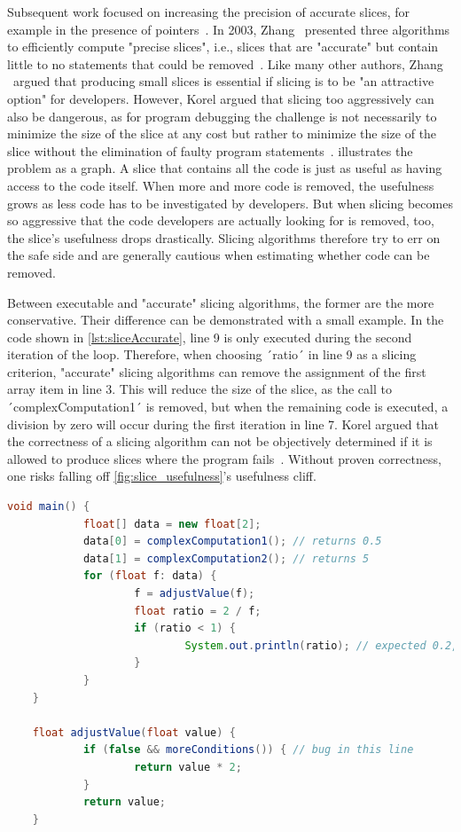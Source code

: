 Subsequent work focused on increasing the precision of accurate slices, for example in the presence of pointers~\cite{atkinson02:program_slicing_using_dynamic, agrawal91:dynamic_slicing_in}.
In 2003, Zhang \etal\ presented three algorithms to efficiently compute "precise slices", i.e., slices that are "accurate" but contain little to no statements that could be removed~\cite{zhang03:precise_dynamic_slicing_algorithms}.
Like many other authors, Zhang \etal\ argued that producing small slices is essential if slicing is to be "an attractive option" for developers.
However, Korel argued that slicing too aggressively can also be dangerous, as
for program debugging the challenge is not necessarily to minimize the size of the slice at any cost but rather to minimize the size of the slice without the elimination of faulty program statements~\cite{korel98:dynamic_program_slicing_methods}.
 illustrates the problem as a graph.
A slice that contains all the code is just as useful as having access to the code itself.
When more and more code is removed, the usefulness grows as less code has to be investigated by developers.
But when slicing becomes so aggressive that the code developers are actually looking for is removed, too, 
the slice's usefulness drops drastically.
Slicing algorithms therefore try to err on the safe side and are generally cautious when estimating whether code can be removed.

Between executable and "accurate" slicing algorithms, the former are the more conservative.
Their difference can be demonstrated with a small example.
In the code shown in \cref{lst:sliceAccurate}, line 9 is only executed during the second iteration of the loop.
Therefore, when choosing ´ratio´ in line 9 as a slicing criterion, "accurate" slicing algorithms can remove the assignment of the first array item in line 3.
This will reduce the size of the slice, as the call to ´complexComputation1´ is removed, but when the remaining code is executed, a division by zero will occur during the first iteration in line 7.
Korel argued that the correctness of a slicing algorithm can not be objectively determined if it is allowed to produce slices where the program fails~\cite{korel98:dynamic_program_slicing_methods}.
Without proven correctness, one risks falling off \cref{fig:slice_usefulness}'s usefulness cliff.

\begin{lstlisting}[float,caption={Code example for accurate slices.},stepnumber=2,numberfirstline=false,label=lst:sliceAccurate,language=Java]
	void main() {
			float[] data = new float[2];
			data[0] = complexComputation1(); // returns 0.5
			data[1] = complexComputation2(); // returns 5
			for (float f: data) {
					f = adjustValue(f);
					float ratio = 2 / f;
					if (ratio < 1) {
							System.out.println(ratio); // expected 0.2, got 0.4
					}
			}
	}

	float adjustValue(float value) {
			if (false && moreConditions()) { // bug in this line
					return value * 2;
			}
			return value;
	}
\end{lstlisting}

